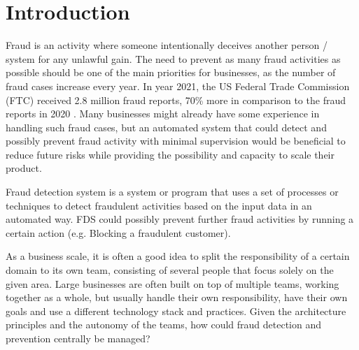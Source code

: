 \chapter{Introduction}

Fraud is an activity where someone intentionally deceives another person / system for any unlawful gain. The need to prevent as many fraud activities as possible should be one of the main priorities for businesses, as the number of fraud cases increase every year. In year 2021, the US Federal Trade Commission (FTC) received 2.8 million fraud reports, 70\% more in comparison to the fraud reports in 2020 \autocite{ftc}. Many businesses might already have some experience in handling such fraud cases, but an automated system that could detect and possibly prevent fraud activity with minimal supervision would be beneficial to reduce future risks while providing the possibility and capacity to scale their product.

Fraud detection system is a system or program that uses a set of processes or techniques to detect fraudulent activities based on the input data in an automated way. FDS could possibly prevent further fraud activities by running a certain action (e.g. Blocking a fraudulent customer). 

As a business scale, it is often a good idea to split the responsibility of a certain domain to its own team, consisting of several people that focus solely on the given area. Large businesses are often built on top of multiple teams, working together as a whole, but usually handle their own responsibility, have their own goals and use a different technology stack and practices. Given the architecture principles and the autonomy of the teams, how could fraud detection and prevention centrally be managed?



